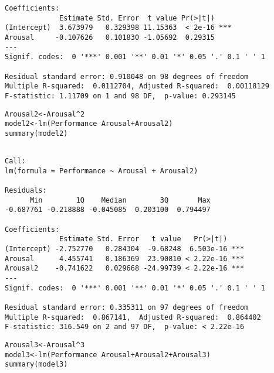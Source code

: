 \documentclass{beamer}\usepackage[]{graphicx}\usepackage[]{color}
\makeatletter
\newcommand{\hlnum}[1]{\textcolor[rgb]{0.824,0.412,0.118}{#1}}%
\newcommand{\hlopt}[1]{\textcolor[rgb]{1,0.894,0.769}{#1}}%
\newcommand{\hlstd}[1]{\textcolor[rgb]{1,0.894,0.769}{#1}}%
\newcommand{\hlkwb}[1]{\textcolor[rgb]{0.804,0.776,0.451}{#1}}%
\newcommand{\hlkwd}[1]{\textcolor[rgb]{1,0.78,0.769}{#1}}%
\newenvironment{kframe}{%
 \def\at@end@of@kframe{}%
 \ifinner\ifhmode%
  \def\at@end@of@kframe{\end{minipage}}%
  \begin{minipage}{\columnwidth}%
 \fi\fi%
 \def\FrameCommand##1{\hskip\@totalleftmargin \hskip-\fboxsep
 \colorbox{shadecolor}{##1}\hskip-\fboxsep
     \hskip-\linewidth \hskip-\@totalleftmargin \hskip\columnwidth}%
 \MakeFramed {\advance\hsize-\width
   \@totalleftmargin\z@ \linewidth\hsize
   \@setminipage}}%
 {\par\unskip\endMakeFramed%
 \at@end@of@kframe}
\newenvironment{knitrout}{}{} %
\makeatother
\begin{document}
\begin{darkframes}
\begin{frame}[fragile]
\begin{knitrout}
\begin{kframe}
\begin{verbatim}
Coefficients:
             Estimate Std. Error  t value Pr(>|t|)    
(Intercept)  3.673979   0.329398 11.15363  < 2e-16 ***
Arousal     -0.107626   0.101830 -1.05692  0.29315    
---
Signif. codes:  0 '***' 0.001 '**' 0.01 '*' 0.05 '.' 0.1 ' ' 1

Residual standard error: 0.910048 on 98 degrees of freedom
Multiple R-squared:  0.0112704,	Adjusted R-squared:  0.00118129 
F-statistic: 1.11709 on 1 and 98 DF,  p-value: 0.293145
\end{verbatim}
\end{kframe}
\end{knitrout}
    \end{frame}

    \begin{frame}[fragile]
      \fontvsm
\begin{knitrout}
\color{fgcolor}\begin{kframe}
\begin{alltt}
\hlstd{Arousal2} \hlkwb{<-} \hlstd{Arousal}\hlopt{^}\hlnum{2}
\hlstd{model2} \hlkwb{<-} \hlkwd{lm}\hlstd{(Performance} \hlopt{~} \hlstd{Arousal} \hlopt{+} \hlstd{Arousal2)}
\hlkwd{summary}\hlstd{(model2)}
\end{alltt}
\begin{verbatim}

Call:
lm(formula = Performance ~ Arousal + Arousal2)

Residuals:
      Min        1Q    Median        3Q       Max 
-0.687761 -0.218888 -0.045085  0.203100  0.794497 

Coefficients:
             Estimate Std. Error   t value   Pr(>|t|)    
(Intercept) -2.752770   0.284304  -9.68248  6.503e-16 ***
Arousal      4.455741   0.186369  23.90810 < 2.22e-16 ***
Arousal2    -0.741622   0.029668 -24.99739 < 2.22e-16 ***
---
Signif. codes:  0 '***' 0.001 '**' 0.01 '*' 0.05 '.' 0.1 ' ' 1

Residual standard error: 0.335311 on 97 degrees of freedom
Multiple R-squared:  0.867141,	Adjusted R-squared:  0.864402 
F-statistic: 316.549 on 2 and 97 DF,  p-value: < 2.22e-16
\end{verbatim}
\end{kframe}
\end{knitrout}
    \end{frame}

    \begin{frame}[fragile]
      \fontvsm
\begin{knitrout}
\color{fgcolor}\begin{kframe}
\begin{alltt}
\hlstd{Arousal3} \hlkwb{<-} \hlstd{Arousal}\hlopt{^}\hlnum{3}
\hlstd{model3} \hlkwb{<-} \hlkwd{lm}\hlstd{(Performance} \hlopt{~} \hlstd{Arousal} \hlopt{+} \hlstd{Arousal2} \hlopt{+} \hlstd{Arousal3)}
\hlkwd{summary}\hlstd{(model3)}
\end{alltt}
\begin{verbatim}


\end{verbatim}
\end{kframe}
\end{knitrout}
\end{frame}
\end{darkframes}
\end{document}
